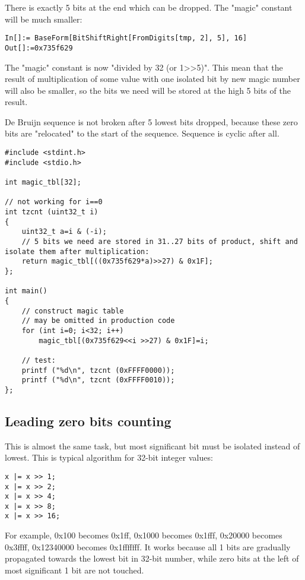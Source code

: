 There is exactly 5 bits at the end which can be dropped.
The "magic" constant will be much smaller:

\begin{lstlisting}
In[]:= BaseForm[BitShiftRight[FromDigits[tmp, 2], 5], 16]
Out[]:=0x735f629
\end{lstlisting}

The "magic" constant is now "divided by 32 (or 1>>5)".
This mean that the result of multiplication of some value with one isolated bit by new magic number will also be smaller, so the bits we need will
be stored at the high 5 bits of the result.

De Bruijn sequence is not broken after 5 lowest bits dropped, because these zero bits are "relocated" to the start of the sequence.
Sequence is cyclic after all.

\begin{lstlisting}[style=customc]
#include <stdint.h>
#include <stdio.h>

int magic_tbl[32];

// not working for i==0
int tzcnt (uint32_t i)
{
	uint32_t a=i & (-i);
	// 5 bits we need are stored in 31..27 bits of product, shift and isolate them after multiplication:
	return magic_tbl[((0x735f629*a)>>27) & 0x1F];
};

int main()
{
	// construct magic table
	// may be omitted in production code
	for (int i=0; i<32; i++)
		magic_tbl[(0x735f629<<i >>27) & 0x1F]=i;
	
	// test:
	printf ("%d\n", tzcnt (0xFFFF0000));
	printf ("%d\n", tzcnt (0xFFFF0010));
};
\end{lstlisting}

\subsection{Leading zero bits counting}

This is almost the same task, but most significant bit must be isolated instead of lowest.
This is typical algorithm for 32-bit integer values:

\begin{lstlisting}
x |= x >> 1;
x |= x >> 2;
x |= x >> 4;
x |= x >> 8;
x |= x >> 16;
\end{lstlisting}

For example, 0x100 becomes 0x1ff, 0x1000 becomes 0x1fff, 0x20000 becomes 0x3ffff, 0x12340000 becomes 0x1fffffff.
It works because all 1 bits are gradually propagated towards the lowest bit in 32-bit number,
while zero bits at the left of most significant 1 bit are not touched.

